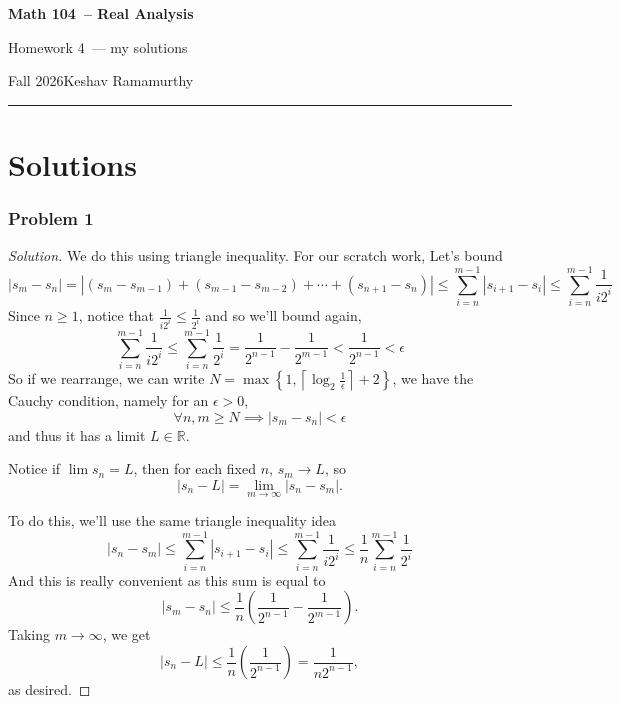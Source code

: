 \documentclass[11pt]{article}
\newcommand{\studentname}{Keshav Ramamurthy}
\newcommand{\coursename}{Math 104}
\newcommand{\courselongname}{Real Analysis}
\newcommand{\assignment}{Homework 4}
\newcommand{\term}{Fall 2026}
\newcommand{\1}{\mathbf{1}}
\theoremstyle{definition}
\newenvironment{solution}{\begin{proof}[Solution]}{\end{proof}}
\begin{document}
\begin{center}
  {\Large\sffamily\bfseries \coursename\ -- \courselongname}\par\vspace{3pt}
  {\sffamily \assignment\ — my solutions}\par\vspace{3pt}
  {\small\sffamily \term\quad\textbullet\quad \studentname}
\end{center}
\medskip
\hrule
\bigskip


\clearpage

\section*{Solutions}
\subsubsection*{Problem 1}
\begin{solution}
We do this using triangle inequality.
For our scratch work, Let's bound \[|s_{m} - s_{n}| = |(s_m -s_{m-1}) + (s_{m-1} - s_{m-2}) + \cdots +
(s_{n+1} - s_{n})| \le \sum_{i=n}^{m-1}|s_{i+1}-s_i| \le \sum_{i=n}^{m-1} \frac{1}{i 2^i} \]
Since \(n \ge 1\), notice that \(\frac{1}{i 2^i}\le \frac{1}{2^i}\) and so we'll bound again,
\[\sum_{i=n}^{m-1}\frac{1}{i2^i} \le \sum_{i=n}^{m-1}\frac{1}{2^i} = \frac{1}{2^{n-1}} -
\frac{1}{2^{m-1}} < \frac{1}{2^{n-1}} < \epsilon\]
So if we rearrange, we can write
\(N = \max\left\{1,\left\lceil\log_{2}{\frac{1}{\epsilon}}\right\rceil + 2\right\}\), we have the Cauchy condition, namely
for an \(\epsilon > 0\), \[\forall n, m \ge N \implies |s_m - s_{n}| < \epsilon \]
and thus it has a limit \(L \in \mathbb{R}\).
\par Notice if \(\lim s_n = L\), then for each fixed \(n\), \(s_m \rightarrow L\), so
\[|s_n-L|=\lim_{m\rightarrow \infty} |s_n - s_m|.\]
\par To do this, we'll use the same triangle inequality idea
\[|s_n - s_m| \le \sum_{i=n}^{m-1} |s_{i+1}-s_i|\le\sum_{i=n}^{m-1} \frac{1}{i2^i}
\le \frac{1}{n}\sum_{i=n}^{m-1}\frac{1}{2^{i}}
\]
And this is really convenient as this sum is equal to
\[|s_m - s_n| \le
\frac{1}{n}\left(\frac{1}{2^{n-1}}-\frac{1}{2^{m-1}}\right).\]
Taking \(m\rightarrow\infty\), we get
\[|s_n-L| \le
\frac{1}{n}\left(\frac{1}{2^{n-1}}\right)
=\frac{1}{n2^{n-1}},\]
as desired.
\end{solution}
\end{document}
